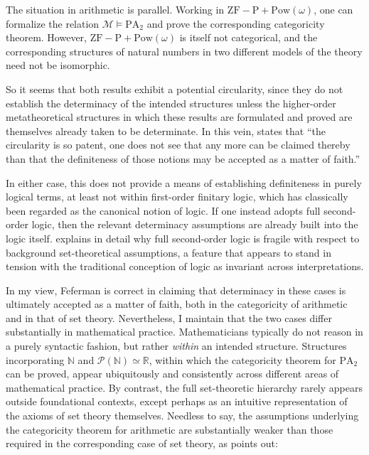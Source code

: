 \documentclass[11pt,a4paper]{article}
\theoremstyle{plain}
\begin{document}
The situation in arithmetic is parallel. Working in $\mathrm{ZF\!-\!P}+\mathrm{Pow}(\omega)$, one can formalize the relation $\mathcal{M} \models \mathrm{PA}_2$ and prove the corresponding categoricity theorem. However, $\mathrm{ZF\!-\!P}+\mathrm{Pow}(\omega)$ is itself not categorical, and the corresponding structures of natural numbers in two different models of the theory need not be isomorphic.

So it seems that both results exhibit a potential circularity, since they do not establish the determinacy of the intended structures unless the higher-order metatheoretical structures in which these results are formulated and proved are themselves already taken to be determinate. In this vein, \textcite[20]{Feferman2011a} states that ``the circularity is so patent, one does not see that any more can be claimed thereby than that the definiteness of those notions may be accepted as a matter of faith.''

In either case, this does not provide a means of establishing definiteness in purely logical terms, at least not within first-order finitary logic, which has classically been regarded as the canonical notion of logic. If one instead adopts full second-order logic, then the relevant determinacy assumptions are already built into the logic itself. \textcite{Koellner2010SecondOrderLogic} explains in detail why full second-order logic is fragile with respect to background set-theoretical assumptions, a feature that appears to stand in tension with the traditional conception of logic as invariant across interpretations.

In my view, Feferman is correct in claiming that determinacy in these cases is ultimately accepted as a matter of faith, both in the categoricity of arithmetic and in that of set theory. Nevertheless, I maintain that the two cases differ substantially in mathematical practice. Mathematicians typically do not reason in a purely syntactic fashion, but rather \textit{within} an intended structure. Structures incorporating $\mathbb{N}$ and $\mathcal{P}(\mathbb{N}) \simeq \mathbb{R}$, within which the categoricity theorem for $\mathrm{PA}_2$ can be proved, appear ubiquitously and consistently across different areas of mathematical practice. By contrast, the full set-theoretic hierarchy rarely appears outside foundational contexts, except perhaps as an intuitive representation of the axioms of set theory themselves. Needless to say, the assumptions underlying the categoricity theorem for arithmetic are substantially weaker than those required in the corresponding case of set theory, as \textcite[141]{Ferreiros2023ConStructuralism} points out:
\end{document}
